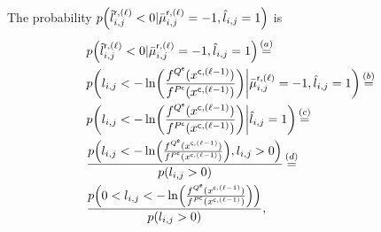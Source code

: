 \documentclass[journal]{IEEEtran}
\newcommand{\mep}{{x}}
\newcommand{\row}{\mathsf{r}}
\newcommand{\col}{\mathsf{c}}
\newcommand{\Q}{\mathsf{Q}}
\newcommand{\Que}{Q^{\mathsf{e}}}
\newcommand{\Puc}{P^{\mathsf{c}}}
\newcommand{\opt}{\tilde{l}}
\newcommand\myeqa{\stackrel{\mathclap{\normalfont\mbox{\scriptsize $(a)$}}}{=}}
\newcommand\myeqb{\stackrel{\mathclap{\normalfont\mbox{\scriptsize $(b)$}}}{=}}
\newcommand\myeqc{\stackrel{\mathclap{\normalfont\mbox{\scriptsize$(c)$}}}{=}}
\newcommand\myeqd{\stackrel{\mathclap{\normalfont\mbox{\scriptsize$(d)$}}}{=}}
\let\originalleft\left
\let\originalright\right
\renewcommand{\left}{\mathopen{}\mathclose\bgroup\originalleft}
\renewcommand{\right}{\aftergroup\egroup\originalright}
\newcommand\scalemath[2]{\scalebox{#1}{\mbox{\ensuremath{\displaystyle #2}}}}   %
\begin{document}
The probability ${p\left(\opt_{i,j}^{\mathsf r, (\ell)} < 0|\bar \mu _{i,j}^{\row,(\ell )}=-1,{{\hat l}_{i,j}=1}\right)}$ is 
\begin{align}\label{p_baysd4} 
& \nonumber {p\left(\opt_{i,j}^{\mathsf r, (\ell)} < 0\lvert\bar \mu _{i,j}^{\row,(\ell )}=-1,{{\hat l}_{i,j}=1}\right)}\myeqa \\ \nonumber & {p\left( l_{i,j} < -\ln \left( \frac{f^{\Que}(\mep^{\col,(\ell-1)})}{f^{\Puc}(\mep^{\col,(\ell-1)})}\right)\bigg\lvert\bar \mu _{i,j}^{\row,(\ell )}=-1,{{\hat l}_{i,j}}=1\right)}\myeqb \\ \nonumber & {p\left( l_{i,j} < -\ln \left( \frac{f^{\Que}(\mep^{\col,(\ell-1)})}{f^{\Puc}(\mep^{\col,(\ell-1)})}\right)\bigg\lvert{{\hat l}_{i,j}}=1\right)}\myeqc \\ & \frac{p\left(l_{i,j}<-\ln \left( \frac{f^{\Que}(\mep^{\col,(\ell-1)})}{f^{\Puc}(\mep^{\col,(\ell-1)})}\right), l_{i,j}>0 \right)}{p(l_{i,j}>0)} \myeqd \\ & \frac{p\left(0 < l_{i,j}<-\ln \left( \frac{f^{\Que}(\mep^{\col,(\ell-1)})}{f^{\Puc}(\mep^{\col,(\ell-1)})}\right) \right)}{p(l_{i,j}>0)},
\end{align}
\end{document}
